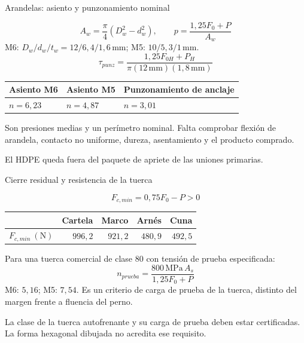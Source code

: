 \documentclass[10pt,aspectratio=169]{beamer}
\newcommand{\mm}{\,\mathrm{mm}}
\newcommand{\MPa}{\,\mathrm{MPa}}
\newcommand{\mcref}{Guía de diseño}
\begin{document}
\gdef\mcref{Mathcad: sección 22 / pág. 37-38}
\begin{frame}[t]{Arandelas: asiento y punzonamiento nominal}

\[
A_w=\frac\pi4(D_w^2-d_w^2),\qquad p=\frac{1{,}25F_0+P}{A_w}
\]
M6: $D_w/d_w/t_w=12/6{,}4/1{,}6\mm$; M5: $10/5{,}3/1\mm$.
\[
\tau_{punz}=\frac{1{,}25F_{0H}+P_H}{\pi(12\mm)(1{,}8\mm)}
\]
\begin{center}\begin{tabular}{lll}\toprule
Asiento M6 & Asiento M5 & Punzonamiento de anclaje\\\midrule
$n=6{,}23$ & $n=4{,}87$ & $n=3{,}01$\\\bottomrule\end{tabular}\end{center}
Son presiones medias y un perímetro nominal. Falta comprobar flexión de arandela, contacto no uniforme, dureza, asentamiento y el producto comprado.

El HDPE queda fuera del paquete de apriete de las uniones primarias.

\end{frame}

\gdef\mcref{Mathcad: sección 23 / pág. 39}
\begin{frame}[t]{Cierre residual y resistencia de la tuerca}

\[
F_{c,min}=0{,}75F_0-P>0
\]
\begin{center}\begin{tabular}{lrrrr}\toprule
 & Cartela & Marco & Arnés & Cuna\\\midrule
$F_{c,min}\ (\mathrm{N})$ & $996{,}2$ & $921{,}2$ & $480{,}9$ & $492{,}5$\\\bottomrule\end{tabular}\end{center}
Para una tuerca comercial de clase 80 con tensión de prueba especificada:
\[
n_{prueba}=\frac{800\MPa\,A_s}{1{,}25F_0+P}
\]
M6: $5{,}16$; M5: $7{,}54$. Es un criterio de carga de prueba de la tuerca, distinto del margen frente a fluencia del perno.

La clase de la tuerca autofrenante y su carga de prueba deben estar certificadas. La forma hexagonal dibujada no acredita ese requisito.

\end{frame}
\end{document}
